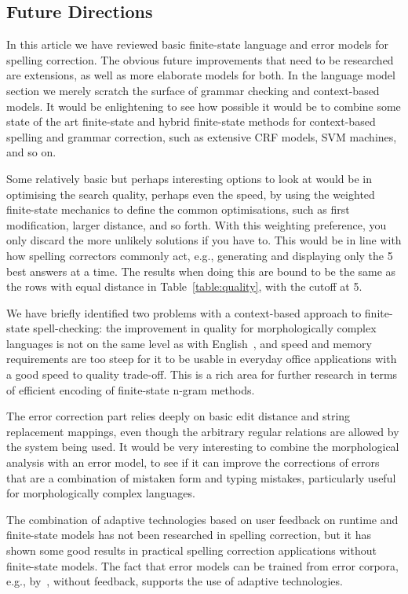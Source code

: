 \documentclass[a4paper,12pt]{article}
\begin{document}
\subsection{Future Directions}
\label{subsec:future}

In this article we have reviewed basic finite-state language and error models
for spelling correction. The obvious future improvements that need to be
researched are extensions, as well as more elaborate models for both. In the language
model section we merely scratch the surface of grammar checking and
context-based models. It would be enlightening to see how possible it would be to
combine some state of the art finite-state and hybrid finite-state methods for
context-based spelling and grammar correction, such as extensive CRF models,
SVM machines, and so on.

Some relatively basic but perhaps interesting options to look at would be in
optimising the search quality, perhaps even the speed, by using the weighted
finite-state mechanics to define the common optimisations, such as first
modification, larger distance, and so forth. With this weighting preference,
you only discard the more unlikely solutions if you have to. This would be in line
with how spelling correctors commonly act, e.g., generating and displaying only
the 5 best answers at a time. The results when doing this are bound to be the same
as the rows with equal distance in Table~\ref{table:quality}, with the cutoff at 5.

We have briefly identified two problems with a context-based approach to
finite-state spell-checking: the improvement in quality for morphologically
complex languages is not on the same level as with
English~\cite[]{wilcoxohearn2008realword}, and speed and memory requirements
are too steep for it to be usable in everyday office applications with a good
speed to quality trade-off. This is a rich area for further research in terms
of efficient encoding of finite-state n-gram methods.

The error correction part relies deeply on basic edit distance and string
replacement mappings, even though the arbitrary regular relations are allowed
by the system being used. It would be very interesting to combine the morphological
analysis with an error model, to see if it can improve the corrections of errors
that are a combination of mistaken form and typing mistakes, particularly 
useful for morphologically complex languages.

The combination of adaptive technologies based on user feedback on runtime and
finite-state models has not been researched in spelling correction, but it has
shown some good results in practical spelling correction applications without
finite-state models. The fact that error models can be trained from error
corpora, e.g., by~\cite{church1991probability}, without feedback, supports the
use of adaptive technologies.
\end{document}
